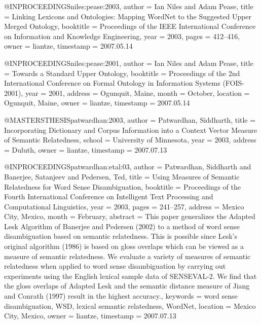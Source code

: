 @INPROCEEDINGS{niles:pease:2003,
  author = {Ian Niles and Adam Pease},
  title = {Linking Lexicons and Ontologies: Mapping {WordNet} to the {Suggested
	Upper Merged Ontology}},
  booktitle = {Proceedings of the IEEE International Conference on Information and
	Knowledge Engineering},
  year = {2003},
  pages = {412--416},
  owner = {liantze},
  timestamp = {2007.05.14}
}

@INPROCEEDINGS{niles:pease:2001,
  author = {Ian Niles and Adam Pease},
  title = {Towards a Standard Upper Ontology},
  booktitle = {Proceedings of the 2nd International Conference on Formal Ontology
	in Information Systems (FOIS-2001)},
  year = {2001},
  address = {Ogunquit, Maine},
  month = {October},
  location = {Ogunquit, Maine},
  owner = {liantze},
  timestamp = {2007.05.14}
}

@MASTERSTHESIS{patwardhan:2003,
  author = {Patwardhan, Siddharth},
  title = {Incorporating Dictionary and Corpus Information into a Context Vector
	Measure of Semantic Relatedness},
  school = {University of Minnesota},
  year = {2003},
  address = {Duluth},
  owner = {liantze},
  timestamp = {2007.07.13}
}

@INPROCEEDINGS{patwardhan:etal:03,
  author = {Patwardhan, Siddharth and Banerjee, Satanjeev and Pedersen, Ted},
  title = {Using Measures of Semantic Relatedness for Word Sense Disambiguation},
  booktitle = {Proceedings of the Fourth International Conference on Intelligent
	Text Processing and Computational Linguistics},
  year = {2003},
  pages = {241--257},
  address = {Mexico City, Mexico},
  month = {February},
  abstract = {This paper generalizes the Adapted Lesk Algorithm of Banerjee and
	Pedersen (2002) to a method of word sense disambiguation based on
	semantic relatedness. This is possible since Lesk's original algorithm
	(1986) is based on gloss overlaps which can be viewed as a measure
	of semantic relatedness. We evaluate a variety of measures of semantic
	relatedness when applied to word sense disambiguation by carrying
	out experiments using the English lexical sample data of SENSEVAL-2.
	We find that the gloss overlaps of Adapted Lesk and the semantic
	distance measure of Jiang and Conrath (1997) result in the highest
	accuracy.},
  keywords = {word sense disambiguation, WSD, lexical semantic relatedness, WordNet},
  location = {Mexico City, Mexico},
  owner = {liantze},
  timestamp = {2007.07.13}
}

